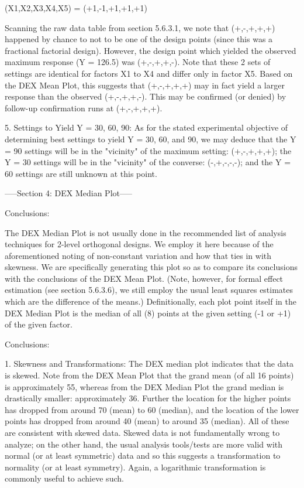           (X1,X2,X3,X4,X5) = (+1,-1,+1,+1,+1)

   Scanning the raw data table from section 5.6.3.1, we note
   that (+,-,+,+,+) happened by chance to not to be one of
   the design points (since this was a fractional factorial
   design).  However, the design point which yielded the
   observed maximum response (Y = 126.5) was (+,-,+,+,-).
   Note that these 2 sets of settings are identical for
   factors X1 to X4 and differ only in factor X5.  Based on
   the DEX Mean Plot, this suggests that (+,-,+,+,+) may in
   fact yield a larger response than the observed
   (+,-,+,+,-).  This may be confirmed (or denied) by
   follow-up confirmation runs at (+,-,+,+,+).

5. Settings to Yield Y = 30, 60, 90: As for the
   stated experimental objective of determining
   best settings to yield Y = 30, 60, and 90, we
   may deduce that the Y = 90 settings will be in
   the "vicinity" of the maximum setting:
   (+,-,+,+,+); the Y = 30 settings will be in the
   "vicinity" of the converse: (-,+,-,-,-); and the Y =
   60 settings are still unknown at this point.

-----Section 4: DEX Median Plot-----

Conclusions:

The DEX Median Plot is not usually done in the
recommended list of analysis techniques for
2-level orthogonal designs.  We employ it here
because of the aforementioned noting of
non-constant variation and how that ties in with
skewness.  We are specifically generating this
plot so as to compare its conclusions with the
conclusions of the DEX Mean Plot.  (Note, however,
for formal effect estimation (see section
5.6.3.6), we still employ the usual least squares
estimates which are the difference of the means.)
Definitionally, each plot point itself in the DEX
Median Plot is the median of all (8) points at the
given setting (-1 or +1) of the given factor.

Conclusions:

1. Skewness and Transformations: The DEX median
   plot indicates that the data is skewed.  Note
   from the DEX Mean Plot that the grand mean (of
   all 16 points) is approximately 55, whereas
   from the DEX Median Plot the grand median is
   drastically smaller: approximately 36.  Further
   the location for the higher points has dropped
   from around 70 (mean) to 60 (median), and the
   location of the lower points has dropped from
   around 40 (mean) to around 35 (median).  All of
   these are consistent with skewed data.  Skewed
   data is not fundamentally wrong to analyze; on
   the other hand, the usual analysis tools/tests
   are more valid with normal (or at least
   symmetric) data and so this suggests a
   transformation to normality (or at least
   symmetry).  Again, a logarithmic transformation
   is commonly useful to achieve such.

